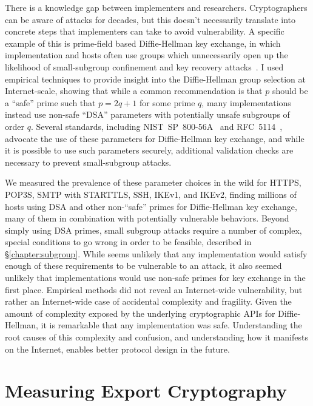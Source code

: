 There is a knowledge gap between implementers and researchers. Cryptographers
can be aware of attacks for decades, but this doesn't necessarily translate
into concrete steps that implementers can take to avoid vulnerability. A
specific example of this is prime-field based Diffie-Hellman key exchange, in
which implementation and hosts often use groups which unnecessarily open up
the likelihood of small-subgroup confinement and key recovery
attacks~\cite{subgroup-2017}. I used empirical techniques to provide insight
into the Diffie-Hellman group selection at Internet-scale, showing that while
a common recommendation is that $p$ should be a ``safe'' prime such that $p =
2q+1$ for some prime $q$, many implementations instead use non-safe ``DSA''
parameters with potentially unsafe subgroups of order $q$. Several standards,
including NIST~SP~800-56A~\cite{sp800} and RFC~5114~\cite{rfc5114}, advocate
the use of these parameters for Diffie-Hellman key exchange, and while it is
possible to use such parameters securely, additional validation checks are
necessary to prevent small-subgroup attacks.

We measured the prevalence of these parameter choices in the wild for HTTPS,
POP3S, SMTP with STARTTLS, SSH, IKEv1, and IKEv2, finding millions of hosts
using DSA and other non-``safe'' primes for Diffie-Hellman key exchange, many
of them in combination with potentially vulnerable behaviors. Beyond simply
using DSA primes, small subgroup attacks require a number of complex, special
conditions to go wrong in order to be feasible, described in
\S\ref{chapter:subgroup}. While seems unlikely that any implementation would
satisfy enough of these requirements to be vulnerable to an attack, it also
seemed unlikely that implementations would use non-safe primes for key
exchange in the first place. Empirical methods did not reveal an
Internet-wide vulnerability, but rather an Internet-wide case of accidental
complexity and fragility. Given the amount of complexity exposed by the
underlying cryptographic APIs for Diffie-Hellman, it is remarkable that any
implementation was safe. Understanding the root causes of this complexity and
confusion, and understanding how it manifests on the Internet, enables better
protocol design in the future.

\section{Measuring Export Cryptography}



